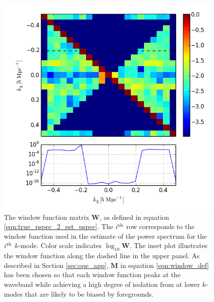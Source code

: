 \documentclass[twocolumn,numberedappendix]{emulateapj} \shorttitle{PSA64}
\begin{document}
\begin{figure}\centering
\includegraphics[width=\columnwidth]{plots/window.png}
\caption{
The window function matrix $\mathbf{W}$, as defined in equation \ref{eqn:true_pspec_2_est_pspec}.
The $i^{\rm th}$ row corresponds to the window function
used in the estimate of the power spectrum for the $i^{\rm th}$ $k$-mode.
Color scale indicates $\log_{10}\mathbf{W}$.
The inset plot illustrates the window function along the dashed line in the upper panel.
As described in Section \ref{sec:oqe_app}, $\mathbf{M}$ in equation \ref{eqn:window_def} has been chosen so that
each window function peaks at the waveband while achieving a high degree of isolation from
at lower $k$-modes that are likely to be biased by foregrounds.
}\label{fig:window_func}
\end{figure}
\end{document}
